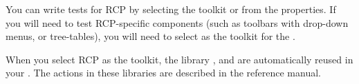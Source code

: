 You can write tests for RCP \gdauts{} by selecting the toolkit  or  from the \gdproject{} properties. If you will need to test RCP-specific components (such as toolbars with drop-down menus, or tree-tables), you will need to select  as the toolkit for the \gdproject{}. 
 
When you select RCP as the \gdproject{} toolkit, the library \gdprojects{} ,  and  are automatically reused in your \gdproject{}. The actions in these libraries are described in the reference manual.

